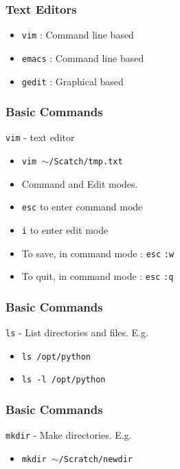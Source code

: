 \documentclass{beamer}
\newcommand{\code}[1]{\colorbox{codegray}{\texttt{#1}}}
\begin{document}
\begin{frame}
\frametitle{Text Editors}
\begin{itemize}
    \item \code{vim}   : Command line based
    \bigskip
    \item \code{emacs} : Command line based
    \bigskip
    \item \code{gedit} : Graphical  based
\end{itemize}
\end{frame}


\begin{frame}
\frametitle{Basic Commands}
\code{vim} - text editor
\bigskip
\begin{itemize}
    \item \code{vim $\sim$/Scatch/tmp.txt}
    \bigskip
    \item Command and Edit modes.
    \bigskip
    \item \code{esc} to enter command mode
    \bigskip
    \item \code{i} to enter edit mode
    \bigskip
    \item To save, in command mode : \code{esc} \code{:w}
    \bigskip
    \item To quit, in command mode : \code{esc} \code{:q}
\end{itemize}
\end{frame}

\begin{frame}
\frametitle{Basic Commands}
\code{ls} - List directories and files. E.g.
\bigskip
\begin{itemize}
    \item \code{ls /opt/python }
    \bigskip

    \item \code{ls -l /opt/python} 
\end{itemize}
\end{frame}



\begin{frame}
\frametitle{Basic Commands}
\code{mkdir} - Make directories. E.g.
\bigskip
\begin{itemize}
    \item \code{mkdir $\sim$/Scratch/newdir}
\end{itemize}
\end{frame}
\end{document}
